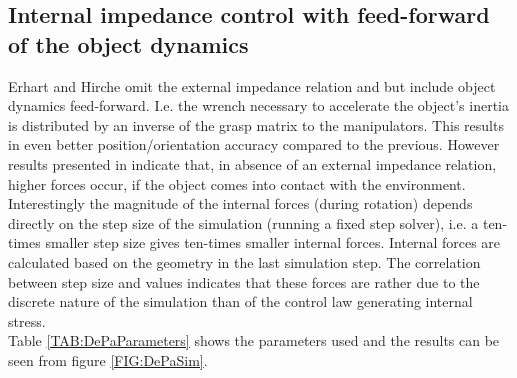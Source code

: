 \documentclass[a4paper,twoside, openright,12pt]{report}
\begin{document}
\subsection{Internal impedance control with feed-forward of the object dynamics}
Erhart and Hirche \cite{Erhart_16} omit the external impedance relation and but include object dynamics feed-forward. I.e. the wrench necessary to accelerate the object's inertia is distributed by an inverse of the grasp matrix to the manipulators. This results in even better position/orientation accuracy compared to the previous. However results presented in \cite{Caccavale_08} indicate that, in absence of an external impedance relation, higher forces occur, if the object comes into contact with the environment.\\
Interestingly the magnitude of the internal forces (during rotation) depends directly on the step size of the simulation (running a fixed step solver), i.e. a ten-times smaller step size gives ten-times smaller internal forces. Internal forces are calculated based on the geometry in the last simulation step. The correlation between step size and values indicates that these forces are rather due to the discrete nature of the simulation than of the control law generating internal stress.\\
Table \ref{TAB:DePaParameters} shows the parameters used and the results can be seen from figure \ref{FIG:DePaSim}.
\end{document}
